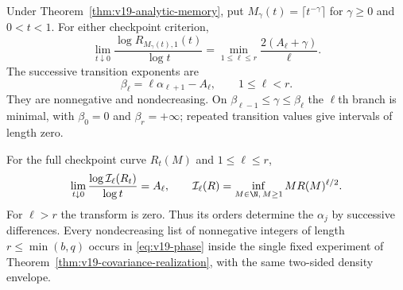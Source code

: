\begin{corollary}
\label{cor:v19-memory-phases}
Under Theorem~\ref{thm:v19-analytic-memory}, put
$M_\gamma(t)=\lceil t^{-\gamma}\rceil$ for $\gamma\ge0$ and
$0<t<1$. For either checkpoint criterion,
\begin{equation}\label{eq:v19-phase}
 \lim_{t\downarrow0}\frac{\log R_{M_\gamma(t),1}(t)}{\log t}
 =\min_{1\le\ell\le r}\frac{2(A_\ell+\gamma)}{\ell}.
\end{equation}
The successive transition exponents are
\begin{equation}\label{eq:v19-transitions}
 \beta_\ell=\ell\alpha_{\ell+1}-A_\ell,
       \qquad 1\le\ell<r.
\end{equation}
They are nonnegative and nondecreasing. On
$\beta_{\ell-1}\le\gamma\le\beta_\ell$ the $\ell$th branch
is minimal, with $\beta_0=0$ and $\beta_r=+\infty$;
repeated transition values give intervals of length zero.

For the full checkpoint curve $R_t(M)$ and $1\le\ell\le r$,
\begin{equation}\label{eq:v19-valuation-inverse}
 \lim_{t\downarrow0}
   \frac{\log\mathcal I_\ell(R_t)}{\log t}=A_\ell,
 \qquad \mathcal I_\ell(R)=\inf_{M\in\N,\,M\ge1}MR(M)^{\ell/2}.
\end{equation}
For $\ell>r$ the transform is zero. Thus its orders determine the
$\alpha_j$ by successive differences.
Every nondecreasing list of nonnegative integers of length
$r\le\min(b,q)$ occurs in \eqref{eq:v19-phase} inside the single
fixed experiment of Theorem~\ref{thm:v19-covariance-realization},
with the same two-sided density envelope.
\end{corollary}
